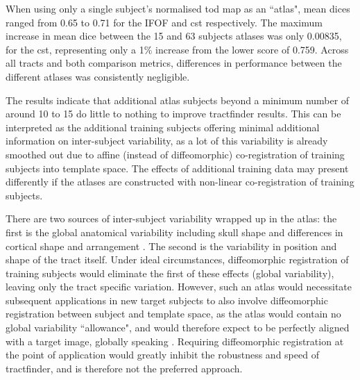 When using only a single subject's normalised \gls{tod} map as an ``atlas", mean \gls{dice}s ranged from 0.65 to 0.71 for the IFOF and \gls{cst} respectively.
The maximum increase in mean \gls{dice} between the 15 and 63 subjects atlases was only 0.00835, for the \gls{cst}, representing only a 1\% increase from the lower score of 0.759.
Across all tracts and both comparison metrics, differences in performance between the different atlases was consistently negligible.

The results indicate that additional atlas subjects beyond a minimum number of around 10 to 15 do little to nothing to improve tractfinder results.
This can be interpreted as the additional training subjects offering minimal additional information on inter-subject variability, as a lot of this variability is already smoothed out due to affine (instead of diffeomorphic) co-registration of training subjects into template space.
The effects of additional training data may present differently if the atlases are constructed with non-linear co-registration of training subjects.

There are two sources of inter-subject variability wrapped up in the atlas: the first is the global anatomical variability including skull shape and differences in cortical shape and arrangement .
The second is the variability in position and shape of the tract itself.
Under ideal circumstances, diffeomorphic registration of training subjects would eliminate the first of these effects (global variability), leaving only the tract specific variation.
However, such an atlas would necessitate subsequent applications in new target subjects to also involve diffeomorphic registration between subject and template space, as the atlas would contain no global variability ``allowance", and would therefore expect to be perfectly aligned with a target image, globally speaking .
Requiring diffeomorphic registration at the point of application would greatly inhibit the robustness and speed of tractfinder, and is therefore not the preferred approach.
